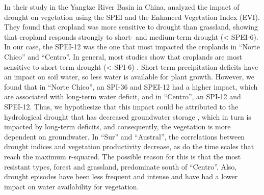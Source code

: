 \documentclass[
  authoryear,
  preprint,
  3p,
  onecolumn]{elsarticle}
\begin{document}
In their study in the Yangtze River Basin in China, \citet{Jiang2020}
analyzed the impact of drought on vegetation using the SPEI and the
Enhanced Vegetation Index (EVI). They found that cropland was more
sensitive to drought than grassland, showing that cropland responds
strongly to short- and medium-term drought (\textless{} SPEI-6). In our
case, the SPEI-12 was the one that most impacted the croplands in
``Norte Chico'' and ``Centro''. In general, most studies show that
croplands are most sensitive to short-term drought (\textless{} SPI-6)
\citep{Zambrano2016, Potopova2015, Dai2020, Rhee2010}. Short-term
precipitation deficits have an impact on soil water, so less water is
available for plant growth. However, we found that in ``Norte Chico'',
an SPI-36 and SPEI-12 had a higher impact, which are associated with
long-term water deficit, and in ``Centro'', an SPI-12 and SPEI-12. Thus,
we hypothesize that this impact could be attributed to the hydrological
drought that has decreased groundwater storage \citep{Taucare2024},
which in turn is impacted by long-term deficits, and consequently, the
vegetation is more dependent on groundwater. In ``Sur'' and ``Austral'',
the correlations between drought indices and vegetation productivity
decrease, as do the time scales that reach the maximum r-squared. The
possible reason for this is that the most resistant types, forest and
grassland, predominate south of ``Centro''. Also, drought episodes have
been less frequent and intense and have had a lower impact on water
availability for vegetation.
\end{document}
